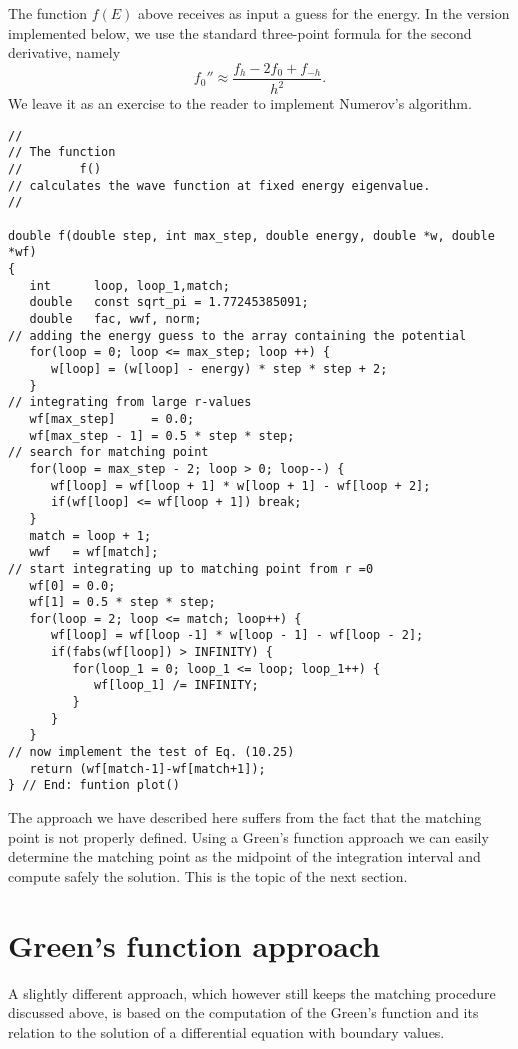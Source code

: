 The function $f(E)$ above receives as input a guess for the energy.
In the version implemented below, we use the standard three-point formula
for the second derivative, namely
\[
 f_0''\approx \frac{ f_h -2f_0 +f_{-h}}{h^2}.
\]
We leave it as an exercise to the reader to implement Numerov's
algorithm. 
\begin{lstlisting}
//
// The function 
//        f()
// calculates the wave function at fixed energy eigenvalue.
//

double f(double step, int max_step, double energy, double *w, double *wf)
{
   int      loop, loop_1,match;
   double   const sqrt_pi = 1.77245385091;
   double   fac, wwf, norm;
// adding the energy guess to the array containing the potential
   for(loop = 0; loop <= max_step; loop ++) {
      w[loop] = (w[loop] - energy) * step * step + 2;
   }
// integrating from large r-values
   wf[max_step]     = 0.0;
   wf[max_step - 1] = 0.5 * step * step;
// search for matching point 
   for(loop = max_step - 2; loop > 0; loop--) {
      wf[loop] = wf[loop + 1] * w[loop + 1] - wf[loop + 2]; 
      if(wf[loop] <= wf[loop + 1]) break;
   }
   match = loop + 1;
   wwf   = wf[match];
// start integrating up to matching point from r =0
   wf[0] = 0.0;
   wf[1] = 0.5 * step * step;
   for(loop = 2; loop <= match; loop++) {
      wf[loop] = wf[loop -1] * w[loop - 1] - wf[loop - 2];
      if(fabs(wf[loop]) > INFINITY) {
         for(loop_1 = 0; loop_1 <= loop; loop_1++) {
            wf[loop_1] /= INFINITY;
         }
      }
   }
// now implement the test of Eq. (10.25)
   return (wf[match-1]-wf[match+1]); 
} // End: funtion plot() 

\end{lstlisting}


The approach we have described here suffers from the fact that the matching point is not properly defined.  Using a Green's function approach we can easily determine the matching point as the midpoint
of the integration interval and compute safely the solution. This is the topic of the next section.

\section{Green's function approach}

A  slightly different approach, which however still keeps the matching procedure discussed above,
is based on the computation of the Green's function and its relation to the solution of a differential equation with boundary values.

